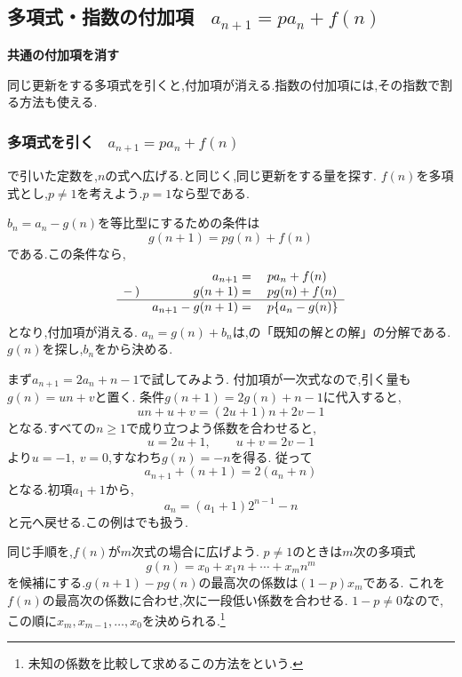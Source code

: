 
\subsection{\texorpdfstring{多項式・指数の付加項 \, $\displaystyle a_{n+1}=pa_n+f(n)$}{多項式・指数の付加項}}\label{節：階差等比複合型}
  \begin{bookpoint}
    \textbf{共通の付加項を消す}\par
    同じ更新をする多項式を引くと,付加項が消える.指数の付加項には,その指数で割る方法も使える.
  \end{bookpoint}
  \subsubsection{\texorpdfstring{多項式を引く \, $\displaystyle a_{n+1}=pa_n+f(n)$}{多項式を引く}}
    で引いた定数を,$n$の式へ広げる.と同じく,同じ更新をする量を探す.
    $f(n)$を多項式とし,$p\ne1$を考えよう.$p=1$なら型である.

    $b_n=a_n-g(n)$を等比型にするための条件は
    \[
      g(n+1)=pg(n)+f(n)
    \]
    である.この条件なら,
    \[
      \begin{array}{rrl}
        &a_{n+1}={}&pa_n+f(n)\\
        -\,)&g(n+1)={}&pg(n)+f(n)\\ \hline
        &a_{n+1}-g(n+1)={}&p\{a_n-g(n)\}
      \end{array}
    \]
    となり,付加項が消える.
    $a_n=g(n)+b_n$は,の「既知の解との解」の分解である.
    $g(n)$を探し,$b_n$をから決める.

    まず$a_{n+1}=2a_n+n-1$で試してみよう.
    付加項が一次式なので,引く量も$g(n)=un+v$と置く.
    条件$g(n+1)=2g(n)+n-1$に代入すると,
    \[
      un+u+v=(2u+1)n+2v-1
    \]
    となる.すべての$n\ge1$で成り立つよう係数を合わせると,
    \[
      u=2u+1,\qquad u+v=2v-1
    \]
    より$u=-1,\ v=0$,すなわち$g(n)=-n$を得る.
    従って
    \[
      a_{n+1}+(n+1)=2(a_n+n)
    \]
    となる.初項$a_1+1$から,
    \[
      a_n=(a_1+1)2^{n-1}-n
    \]
    と元へ戻せる.この例はでも扱う.

    同じ手順を,$f(n)$が$m$次式の場合に広げよう.
    $p\ne1$のときは$m$次の多項式
    \[
      g(n)=x_0+x_1n+\cdots+x_mn^m
    \]
    を候補にする.$g(n+1)-pg(n)$の最高次の係数は$(1-p)x_m$である.
    これを$f(n)$の最高次の係数に合わせ,次に一段低い係数を合わせる.
    $1-p\ne0$なので,この順に$x_m,x_{m-1},\ldots,x_0$を決められる.\footnote{未知の係数を比較して求めるこの方法をという.}

